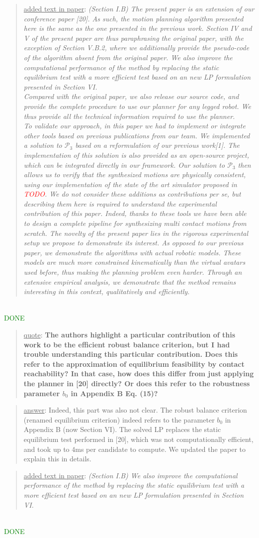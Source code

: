 \documentclass[a4paper]{article}
\newcommand{\done}[0]{\textcolor{green}{DONE}}
\newcommand\quot[1]{\begin{quote} \underline{quote}: \textbf{#1}\end{quote}}
\newcommand\as[1]{\begin{quote} \underline{answer}: {#1}\end{quote} }
\newcommand\qt[1]{\begin{quote} \underline{added text in paper}: \textit{#1}\end{quote} \leavevmode \\ }
\begin{document}
\qt{(Section I.B) The present paper is an extension of our conference paper [20]. As such, the motion planning algorithm presented here is the same as the one presented in the
previous work. Section IV and V of the present paper are thus paraphrasing the original paper, with the exception of Section V.B.2, where we additionally provide the pseudo-code of the algorithm absent from the original paper. We also improve the computational performance of the method by replacing the static equilibrium test with a more efficient test based on an new LP formulation presented in Section VI. \\
Compared with the original paper, we also release our source code, and provide the complete procedure to use our planner for any legged robot. We thus provide
all the technical information required to use the planner. \\
To validate our approach, in this paper we had to implement or integrate other tools based on previous publications from our team. We implemented a solution to $\mathcal{P}_3$ based on a reformulation of our previous work[1]. The implementation of this solution is also provided as an open-source project, which can be integrated directly in our framework. Our solution to $\mathcal{P}_3$ then allows us to verify that the synthesized motions are physically consistent, using our implementation of the state of the art simulator proposed in \textcolor{red}{TODO}.
We do not consider these additions as contributions per se, but describing them here is required to understand the experimental contribution of this paper.
Indeed, thanks to these tools we have been able to design a complete pipeline for synthesizing multi contact motions from scratch.
The novelty of the present paper lies in the rigorous experimental setup we propose to demonstrate its interest.
As opposed to our previous paper, we demonstrate the algorithms with actual robotic models. These models are much more constrained kinematically than the virtual avatars used before,
thus making the planning problem even harder. Through an extensive empirical analysis, we demonstrate that the method remains interesting in this context, qualitatively and efficiently.}\done

\quot{The authors highlight a particular
contribution of this work to be the efficient robust balance criterion,
but I had trouble understanding this particular contribution. Does this
refer to the approximation of equilibrium feasibility by contact
reachability? In that case, how does this differ from just applying the
planner in [20] directly? Or does this refer to the robustness
parameter $b_0$ in Appendix B Eq. (15)?}
\as{Indeed, this part was also not clear. The robust balance criterion (renamed equilibrium criterion) indeed refers to the parameter $b_0$ in Appendix B (now Section VI). The solved
LP replaces the static equilibrium test performed in [20], which was not computationally efficient, and took up to 4ms per candidate to compute. We updated the paper to explain
this in details.}
\qt{(Section I.B) We also improve the computational performance
of the method by replacing the static equilibrium test with a more efficient test based on an
new LP formulation presented in Section VI.}
\done
\end{document}
